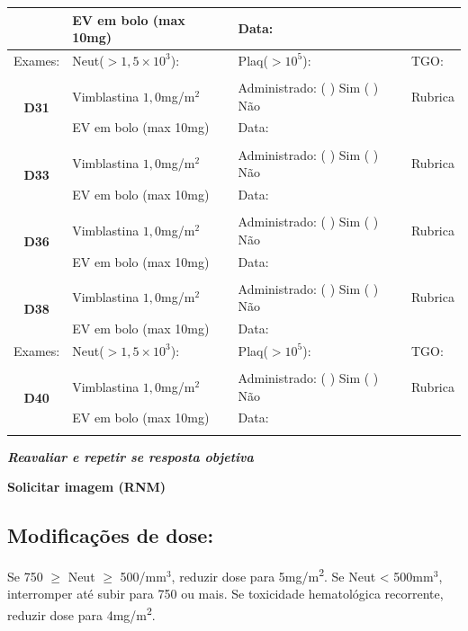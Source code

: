 \documentclass[11pt,a4paper,oldfontcommands]{memoir}
\begin{document}
\begin{center}
\begin{longtable}{p{1cm}p{5cm}|p{5cm}|p{3cm}}
    \multicolumn{1}{c|}{}&{EV em bolo (max 10mg)}&{Data:}&\\
    \hline
    {\tiny{Exames:}}&{\tiny{Neut(\(>1,5\times10^3\)):}}&{\tiny{Plaq(\(>10^5\)):}}&{\tiny{TGO:}}
    \\
    \hline
    \\
    \hline
    \multicolumn{1}{c|}{\multirow{2}{*}{\textbf{D31}}}&{Vimblastina \(1,0\)mg/m\(^2\)}&{Administrado: (  ) Sim (  ) Não}&{Rubrica}\\
    \multicolumn{1}{c|}{}&{EV em bolo (max 10mg)}&{Data:}&\\
    \hline
    \\
    \hline
    \multicolumn{1}{c|}{\multirow{2}{*}{\textbf{D33}}}&{Vimblastina \(1,0\)mg/m\(^2\)}&{Administrado: (  ) Sim (  ) Não}&{Rubrica}\\
    \multicolumn{1}{c|}{}&{EV em bolo (max 10mg)}&{Data:}&\\
    \hline
    \\
    \hline
    \multicolumn{1}{c|}{\multirow{2}{*}{\textbf{D36}}}&{Vimblastina \(1,0\)mg/m\(^2\)}&{Administrado: (  ) Sim (  ) Não}&{Rubrica}\\
    \multicolumn{1}{c|}{}&{EV em bolo (max 10mg)}&{Data:}&\\
    \hline
    \\
    \hline
    \multicolumn{1}{c|}{\multirow{2}{*}{\textbf{D38}}}&{Vimblastina \(1,0\)mg/m\(^2\)}&{Administrado: (  ) Sim (  ) Não}&{Rubrica}\\
    \multicolumn{1}{c|}{}&{EV em bolo (max 10mg)}&{Data:}&\\
    \hline
    {\tiny{Exames:}}&{\tiny{Neut(\(>1,5\times10^3\)):}}&{\tiny{Plaq(\(>10^5\)):}}&{\tiny{TGO:}}
    \\
    \hline\\
    \hline
    \multicolumn{1}{c|}{\multirow{2}{*}{\textbf{D40}}}&{Vimblastina \(1,0\)mg/m\(^2\)}&{Administrado: (  ) Sim (  ) Não}&{Rubrica}\\
    \multicolumn{1}{c|}{}&{EV em bolo (max 10mg)}&{Data:}&\\
    \hline
    \\
   \hline
\end{longtable}
\textbf{\textit{Reavaliar e repetir se resposta objetiva}}

\textbf{Solicitar imagem (RNM)}
\end{center}
\subsection{Modificações de dose:}
Se 750 $\geq$ Neut $\geq$ 500/mm\(^3\), reduzir dose para 5mg/m\textsuperscript{2}. Se Neut < 500mm\(^3\), interromper até subir para 750 ou mais. Se toxicidade hematológica recorrente, reduzir dose para 4mg/m\textsuperscript{2}.
\end{document}
